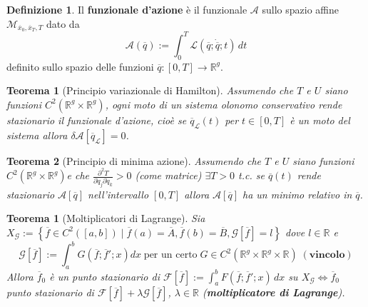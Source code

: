 \documentclass{book}
\theoremstyle{plain}
\newtheorem{teo}{Teorema}[chapter]
\newtheorem*{teo*}{Teorema}
\theoremstyle{plain}
\theoremstyle{plain}
\theoremstyle{plain}
\theoremstyle{plain}
\theoremstyle{definition}
\newtheorem{defi}{Definizione}[chapter]
\theoremstyle{remark}
\theoremstyle{definition}
\begin{document}
\begin{defi}
    Il \textbf{funzionale d'azione} è il funzionale $\mathcal{A}$ sullo spazio affine $\mathcal{M}_{\overline{x}_0,\overline{x}_T,T}$ dato da
    \begin{displaymath}
        \boxed{
        \mathcal{A}(\overline{q}):=\int_0^T\mathcal{L}(\overline{q};\dot{\overline{q}};t)\,dt
        }
    \end{displaymath}
    definito sullo spazio delle funzioni $\overline{q}:[0,T]\to\mathbb{R}^g$.
\end{defi}

\begin{teo}[Principio variazionale di Hamilton]
    Assumendo che $T$ e $U$ siano funzioni $C^2(\mathbb{R}^g\times\mathbb{R}^g)$, ogni moto di un sistema olonomo conservativo rende stazionario il funzionale d'azione, cioè se $\overline{q}_{\mathcal{L}}(t)$ per $t\in[0,T]$ è un moto del sistema allora $\delta\mathcal{A}[\overline{q}_{\mathcal{L}}]=0$.
\end{teo}

\begin{teo}[Principio di minima azione]
     Assumendo che $T$ e $U$ siano funzioni $C^2(\mathbb{R}^g\times\mathbb{R}^g)$e che $\frac{\partial^2T}{\partial\dot{q}_j\partial\dot{q}_k}>0$ (come matrice) $\exists T>0 $ t.c. se $\overline{q}(t)$ rende stazionario $\mathcal{A}[\overline{q}]$ nell'intervallo $[0,T]$ allora $\mathcal{A}[\overline{q}]$ ha un minimo relativo in $\overline{q}$.
\end{teo}

\begin{teo*}[Moltiplicatori di Lagrange]
\everymath{\displaystyle}
    Sia $X_{\mathcal{G}}:=\left\{\overline{f}\in C^2([a,b]) \; |\; \overline{f}(a)=\overline{A}, \overline{f}(b)=\overline{B}, \mathcal{G}[\overline{f}]=l\right\}$ dove $l\in\mathbb{R}$ e
    \begin{displaymath}
        \mathcal{G}[\overline{f}]:=\int_a^bG(\overline{f};\overline{f}';x)dx \; \text{per un certo} \; G\in C^2(\mathbb{R}^g\times\mathbb{R}^g\times\mathbb{R}) \; (\textbf{vincolo})
    \end{displaymath}
    Allora $\overline{f}_0$ è un punto stazionario di $\mathcal{F}[\overline{f}]:=\int_a^bF(\overline{f};\overline{f}';x)\,dx$ su $X_{\mathcal{G}} \iff \overline{f}_0$ punto stazionario di $\mathcal{F}[\overline{f}]+\lambda\mathcal{G}[\overline{f}]$, $\lambda\in\mathbb{R}$ (\textbf{moltiplicatore di Lagrange}).
\end{teo*}
\end{document}
